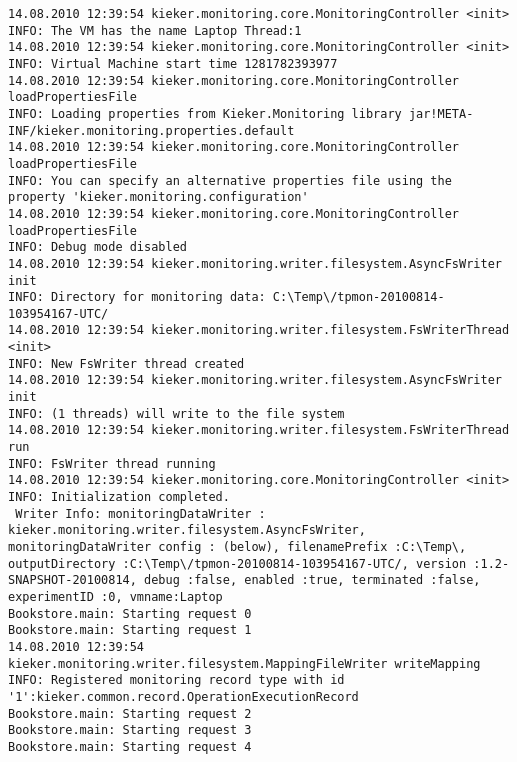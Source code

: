 \setBashListing
\begin{lstlisting}[caption=Execution of the manually instrumented Bookstore application (Section~\ref{sec:example:monitoring})]
14.08.2010 12:39:54 kieker.monitoring.core.MonitoringController <init>
INFO: The VM has the name Laptop Thread:1
14.08.2010 12:39:54 kieker.monitoring.core.MonitoringController <init>
INFO: Virtual Machine start time 1281782393977
14.08.2010 12:39:54 kieker.monitoring.core.MonitoringController loadPropertiesFile
INFO: Loading properties from Kieker.Monitoring library jar!META-INF/kieker.monitoring.properties.default
14.08.2010 12:39:54 kieker.monitoring.core.MonitoringController loadPropertiesFile
INFO: You can specify an alternative properties file using the property 'kieker.monitoring.configuration'
14.08.2010 12:39:54 kieker.monitoring.core.MonitoringController loadPropertiesFile
INFO: Debug mode disabled
14.08.2010 12:39:54 kieker.monitoring.writer.filesystem.AsyncFsWriter init
INFO: Directory for monitoring data: C:\Temp\/tpmon-20100814-103954167-UTC/
14.08.2010 12:39:54 kieker.monitoring.writer.filesystem.FsWriterThread <init>
INFO: New FsWriter thread created
14.08.2010 12:39:54 kieker.monitoring.writer.filesystem.AsyncFsWriter init
INFO: (1 threads) will write to the file system
14.08.2010 12:39:54 kieker.monitoring.writer.filesystem.FsWriterThread run
INFO: FsWriter thread running
14.08.2010 12:39:54 kieker.monitoring.core.MonitoringController <init>
INFO: Initialization completed.
 Writer Info: monitoringDataWriter : kieker.monitoring.writer.filesystem.AsyncFsWriter, monitoringDataWriter config : (below), filenamePrefix :C:\Temp\, outputDirectory :C:\Temp\/tpmon-20100814-103954167-UTC/, version :1.2-SNAPSHOT-20100814, debug :false, enabled :true, terminated :false, experimentID :0, vmname:Laptop
Bookstore.main: Starting request 0
Bookstore.main: Starting request 1
14.08.2010 12:39:54 kieker.monitoring.writer.filesystem.MappingFileWriter writeMapping
INFO: Registered monitoring record type with id '1':kieker.common.record.OperationExecutionRecord
Bookstore.main: Starting request 2
Bookstore.main: Starting request 3
Bookstore.main: Starting request 4
\end{lstlisting}